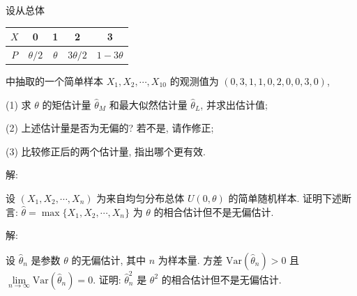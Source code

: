 \documentclass[standard]{ExBook}
\begin{document}
\begin{qitems}
\vspace{-5em}

    \begin{bbox}
    \begin{shaded}
        \qitem
设从总体  

\begin{center}
\setlength{\tabcolsep}{40pt}
\begin{tabular}{c|cccc}
\hline
\(X\) & 0 & 1 & 2 & 3 \\
\hline
\(P\) & \(\theta/2\) & \(\theta\) & \(3\theta/2\) & \(1-3\theta\) \\
\hline
\end{tabular}
\end{center}

中抽取的一个简单样本 \(X_1, X_2, \cdots, X_{10}\) 的观测值为 \((0, 3, 1, 1, 0, 2, 0, 0, 3, 0)\),

(1) 求 \(\theta\) 的矩估计量 \(\hat{\theta}_M\) 和最大似然估计量 \(\hat{\theta}_L\), 并求出估计值;  

(2) 上述估计量是否为无偏的? 若不是, 请作修正;  

(3) 比较修正后的两个估计量, 指出哪个更有效.
    \end{shaded}
    \end{bbox}

\vspace{-5em}

    \begin{bbox}
解: 
    \end{bbox}

\vspace{-5em}

    \begin{bbox}
    \begin{shaded}
        \qitem
设 \((X_1, X_2, \cdots, X_n)\) 为来自均匀分布总体 \(U(0, \theta)\) 的简单随机样本. 证明下述断言: \(\hat{\theta} = \max\{X_1, X_2, \cdots, X_n\}\) 为 \(\theta\) 的相合估计但不是无偏估计.
    \end{shaded}
    \end{bbox}

\vspace{-5em}

    \begin{bbox}
解: 
    \end{bbox}

\vspace{-5em}

    \begin{bbox}
    \begin{shaded}
        \qitem
设 \(\hat{\theta}_n\) 是参数 \(\theta\) 的无偏估计, 其中 \(n\) 为样本量. 方差 \(\text{Var}(\hat{\theta}_n) > 0\) 且 \(\lim\limits_{n \to \infty} \text{Var}(\hat{\theta}_n) = 0\). 证明: \(\hat{\theta}^2_n\) 是 \(\theta^2\) 的相合估计但不是无偏估计.
    \end{shaded}
    \end{bbox}


\end{qitems}
\end{document}
